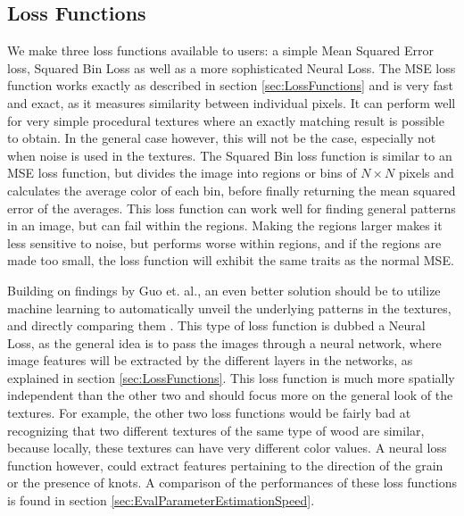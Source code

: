 \subsection{Loss Functions}\label{sec:MethodLossFunctions}

We make three loss functions available to users: a simple Mean Squared Error loss, Squared Bin Loss as well as a more sophisticated Neural Loss. The MSE loss function works exactly as described in section \ref{sec:LossFunctions} and is very fast and exact, as it measures similarity between individual pixels. It can perform well for very simple procedural textures where an exactly matching result is possible to obtain. In the general case however, this will not be the case, especially not when noise is used in the textures. The Squared Bin loss function is similar to an MSE loss function, but divides the image into regions or bins of $N\times N$ pixels and calculates the average color of each bin, before finally returning the mean squared error of the averages. This loss function can work well for finding general patterns in an image, but can fail within the regions. Making the regions larger makes it less sensitive to noise, but performs worse within regions, and if the regions are made too small, the loss function will exhibit the same traits as the normal MSE. 

Building on findings by Guo et. al., an even better solution should be to utilize machine learning to automatically unveil the underlying patterns in the textures, and directly comparing them \cite{guo_2019_a}. This type of loss function is dubbed a Neural Loss, as the general idea is to pass the images through a neural network, where image features will be extracted by the different layers in the networks, as explained in section \ref{sec:LossFunctions}. This loss function is much more spatially independent than the other two and should focus more on the general look of the textures. For example, the other two loss functions would be fairly bad at recognizing that two different textures of the same type of wood are similar, because locally, these textures can have very different color values. A neural loss function however, could extract features pertaining to the direction of the grain or the presence of knots. A comparison of the performances of these loss functions is found in section \ref{sec:EvalParameterEstimationSpeed}.

